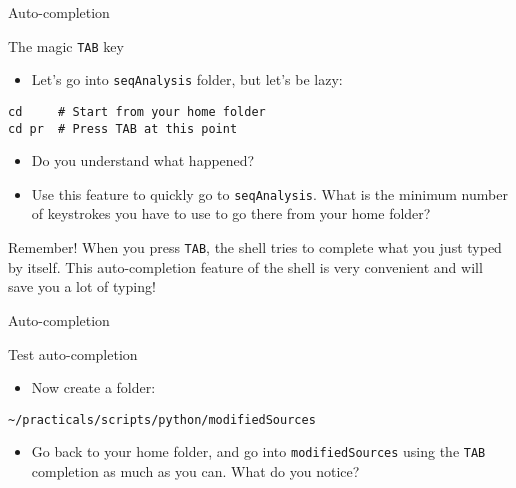 \documentclass[big]{beamer}
\begin{document}
\begin{frame}[fragile,label=sec-2-20]{Auto-completion}
 \begin{block}{The magic \texttt{TAB} key}
\begin{itemize}
\item Let's go into \texttt{seqAnalysis} folder, but let's be lazy:
\end{itemize}
\begin{verbatim}
cd     # Start from your home folder
cd pr  # Press TAB at this point
\end{verbatim}
\begin{itemize}
\item Do you understand what happened?
\item Use this feature to quickly go to \texttt{seqAnalysis}. What is the minimum number
of keystrokes you have to use to go there from your home folder?
\end{itemize}
\end{block}
\begin{block}{Remember!}
When you press \alert{\texttt{TAB}}, the shell tries to complete what you just typed by
itself. This \alert{auto-completion feature} of the shell is very convenient and will
save you a lot of typing!
\end{block}
\end{frame}
\begin{frame}[fragile,label=sec-2-21]{Auto-completion}
 \begin{block}{Test auto-completion}
\begin{itemize}
\item Now create a folder:
\end{itemize}
\begin{verbatim}
~/practicals/scripts/python/modifiedSources
\end{verbatim}
\begin{itemize}
\item Go back to your home folder, and go into \texttt{modifiedSources} using the \texttt{TAB}
completion as much as you can. What do you notice?
\end{itemize}
\end{block}
\end{frame}
\end{document}

